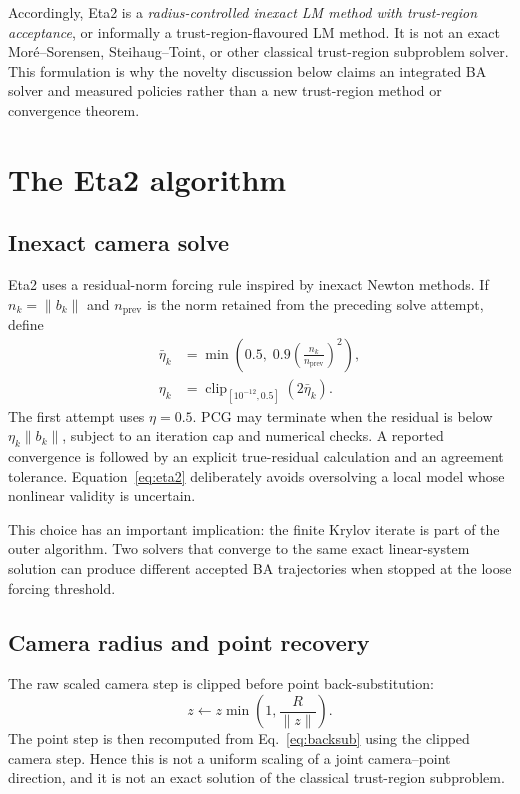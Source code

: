 \documentclass[10pt]{article}
\begin{document}
Accordingly, Eta2 is a \emph{radius-controlled inexact LM method with trust-region acceptance}, or informally a trust-region-flavoured LM method.  It is not an exact Mor\'e--Sorensen, Steihaug--Toint, or other classical trust-region subproblem solver.  This formulation is why the novelty discussion below claims an integrated BA solver and measured policies rather than a new trust-region method or convergence theorem.

\section{The Eta2 algorithm}

\subsection{Inexact camera solve}

Eta2 uses a residual-norm forcing rule inspired by inexact Newton methods\cite{EisenstatWalker1996}.  If $n_k=\lVert b_k\rVert$ and $n_{\mathrm{prev}}$ is the norm retained from the preceding solve attempt, define
\begin{align}
  \bar\eta_k&=\min\!\left(0.5,\;0.9\left(\frac{n_k}{n_{\mathrm{prev}}}\right)^2\right),\\
  \eta_k&=\operatorname{clip}_{[10^{-12},0.5]}(2\bar\eta_k). \label{eq:eta2}
\end{align}
The first attempt uses $\eta=0.5$.  PCG may terminate when the residual is below $\eta_k\lVert b_k\rVert$, subject to an iteration cap and numerical checks.  A reported convergence is followed by an explicit true-residual calculation and an agreement tolerance.  Equation~\eqref{eq:eta2} deliberately avoids oversolving a local model whose nonlinear validity is uncertain.

This choice has an important implication: the finite Krylov iterate is part of the outer algorithm.  Two solvers that converge to the same exact linear-system solution can produce different accepted BA trajectories when stopped at the loose forcing threshold.

\subsection{Camera radius and point recovery}

The raw scaled camera step is clipped before point back-substitution:
\begin{equation}
  z\leftarrow z\min\left(1,\frac{R}{\lVert z\rVert}\right). \label{eq:clip}
\end{equation}
The point step is then recomputed from Eq.~\eqref{eq:backsub} using the clipped camera step.  Hence this is not a uniform scaling of a joint camera--point direction, and it is not an exact solution of the classical trust-region subproblem.
\end{document}
